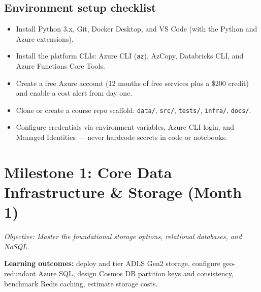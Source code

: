 \documentclass[11pt, a4paper]{article}
\begin{document}
\subsection*{Environment setup checklist}
\begin{itemize}[label=-]
    \item Install Python 3.x, Git, Docker Desktop, and VS Code (with the Python and Azure extensions).
    \item Install the platform CLIs: Azure CLI (\texttt{az}), AzCopy, Databricks CLI, and Azure Functions Core Tools.
    \item Create a free Azure account (12 months of free services plus a \$200 credit) and enable a cost alert from day one.
    \item Clone or create a course repo scaffold: \texttt{data/}, \texttt{src/}, \texttt{tests/}, \texttt{infra/}, \texttt{docs/}.
    \item Configure credentials via environment variables, Azure CLI login, and Managed Identities --- never hardcode secrets in code or notebooks.
\end{itemize}

\section{Milestone 1: Core Data Infrastructure \& Storage (Month 1)}
\textit{Objective: Master the foundational storage options, relational databases, and NoSQL.}
\par\noindent\textbf{Learning outcomes:} deploy and tier ADLS Gen2 storage, configure geo-redundant Azure SQL, design Cosmos DB partition keys and consistency, benchmark Redis caching, estimate storage costs.
\end{document}
